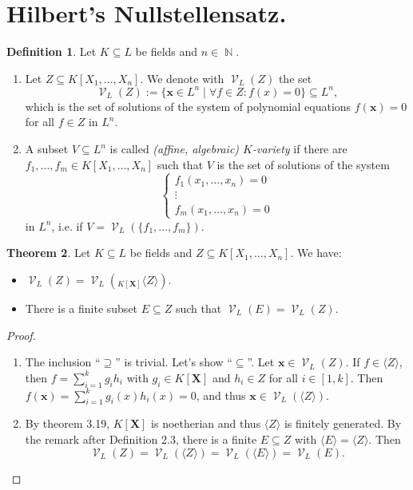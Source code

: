 \documentclass[12pt,a4paper]{report}
\theoremstyle{definition}
\newtheorem{theorem}{Theorem}[chapter] %
\newtheorem{defn}[theorem]{Definition}
\theoremstyle{num.custom-title}
\DeclareMathOperator{\N}{\mathbb{N}}
\DeclareMathOperator{\V}{\mathcal{V}}
\DeclareMathOperator{\sse}{\subseteq}
\newcommand{\X}{\mathbf{X}}
\newcommand{\x}{\mathbf{x}}
\begin{document}
\section{Hilbert's Nullstellensatz.}

\begin{defn}
Let $K \sse L$ be fields and $n \in \N$.
\begin{enumerate}
\item Let $Z \sse K[X_1,...,X_n]$. We denote with $\V_L(Z)$ the set
\[
\V_L(Z) := \{ \x \in L^n \mid \forall f \in Z \colon f(x)=0 \}	 \sse L^n, 
\]
which is the set of solutions of the system of polynomial equations $f(\x) = 0$ for all $f \in Z$ in $L^n$.
\item A subset $V \sse L^n$ is called \emph{(affine, algebraic) $K$-variety} if there are $f_1,...,f_m \in K[X_1,...,X_n]$ such that $V$ is the set of solutions of the system
\[
\begin{cases}
f_1(x_1,\ldots,x_n)=0 \\
\vdots \\
f_m(x_1,\ldots,x_n)=0
\end{cases}
\]
in $L^n$, i.e. if $V = \V_L(\{f_1,...,f_m\})$.
\end{enumerate}
\end{defn}

\begin{theorem}
Let $K \sse L$ be fields and $Z \sse K[X_1,...,X_n]$. We have:
\begin{itemize}
\item $\V_L(Z) = \V_L( _{K[\X]} \langle Z \rangle )$.
\item There is a finite subset $E \sse Z$ such that $\V_L(E) = \V_L(Z)$.
\end{itemize}
\begin{proof}\ 
\begin{enumerate}
\item The inclusion ``$\supseteq$'' is trivial. Let's show ``$\sse$''. Let $\x \in \V_L(Z)$. If $f \in \langle Z \rangle$, then $f = \sum_{i=1}^k g_i h_i$ with $g_i \in K[\X]$ and $h_i \in Z$ for all $i \in [1,k]$. Then $f(\x) = \sum_{i=1}^k g_i(x) h_i(x) = 0$, and thus $\x \in \V_L(\langle Z \rangle)$.
\item By theorem 3.19, $K[\X]$ is noetherian and thus $\langle Z \rangle$ is finitely generated. By the remark after Definition 2.3, there is a finite $E \sse Z$ with $\langle E \rangle = \langle Z \rangle$. Then
\[
\V_L(Z) = \V_L(\langle Z \rangle) = \V_L(\langle E \rangle) = \V_L(E).
\]
\end{enumerate}
\end{proof}
\end{theorem}
\end{document}
